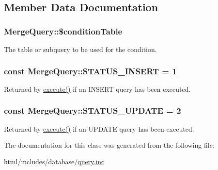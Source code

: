 \subsection{Member Data Documentation}
\hypertarget{classMergeQuery_a8f593caec31bdbc33f24bd741a58a6e5}{
\subsubsection[{\$conditionTable}]{\setlength{\rightskip}{0pt plus 5cm}MergeQuery::\$conditionTable}}
\label{classMergeQuery_a8f593caec31bdbc33f24bd741a58a6e5}
The table or subquery to be used for the condition. \hypertarget{classMergeQuery_a42f1aad21544decc65082fc10fd2d68a}{
\subsubsection[{STATUS\_\-INSERT}]{\setlength{\rightskip}{0pt plus 5cm}const {\bf MergeQuery::STATUS\_\-INSERT} = 1}}
\label{classMergeQuery_a42f1aad21544decc65082fc10fd2d68a}
Returned by \hyperlink{classMergeQuery_aeea46fdb119752efd2048d66b9fe8de8}{execute()} if an INSERT query has been executed. \hypertarget{classMergeQuery_ad79d3ece9a03a3a63bef6560e90fc776}{
\subsubsection[{STATUS\_\-UPDATE}]{\setlength{\rightskip}{0pt plus 5cm}const {\bf MergeQuery::STATUS\_\-UPDATE} = 2}}
\label{classMergeQuery_ad79d3ece9a03a3a63bef6560e90fc776}
Returned by \hyperlink{classMergeQuery_aeea46fdb119752efd2048d66b9fe8de8}{execute()} if an UPDATE query has been executed. 

The documentation for this class was generated from the following file:\begin{DoxyCompactItemize}
\item 
html/includes/database/\hyperlink{query_8inc}{query.inc}\end{DoxyCompactItemize}
